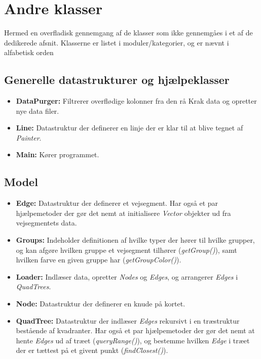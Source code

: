 \section{Andre klasser}

Hermed en overfladisk gennemgang af de klasser som ikke gennemgåes i et af de dedikerede afsnit. Klasserne er listet i moduler/kategorier, og er nævnt i alfabetisk orden

\subsection{Generelle datastrukturer og hjælpeklasser}

\begin{itemize}
	\item \textbf{DataPurger:} Filtrerer overflødige kolonner fra den rå Krak data og opretter nye data filer.
	\item \textbf{Line:} Datastruktur der definerer en linje der er klar til at blive tegnet af \emph{Painter}.
	\item \textbf{Main:} Kører programmet.
\end{itemize}

\subsection{Model}

\begin{itemize}
	\item \textbf{Edge:} Datastruktur der definerer et vejsegment. Har også et par hjælpemetoder der gør det nemt at initialisere \emph{Vector} objekter ud fra vejsegmentets data.
	\item \textbf{Groups:} Indeholder definitionen af hvilke typer der hører til hvilke grupper, og kan afgøre hvilken gruppe et vejsegment tilhører (\emph{getGroup()}), samt hvilken farve en given gruppe har (\emph{getGroupColor()}).
	\item \textbf{Loader:} Indlæser data, opretter \emph{Nodes} og \emph{Edges}, og arrangerer \emph{Edges} i \emph{QuadTrees}.
	\item \textbf{Node:} Datastruktur der definerer en knude på kortet.
	\item \textbf{QuadTree:} Datastruktur der indlæser \emph{Edges} rekursivt i en træstruktur bestående af kvadranter. Har også et par hjælpemetoder der gør det nemt at hente \emph{Edges} ud af træet (\emph{queryRange()}), og bestemme hvilken \emph{Edge} i træet der er tættest på et givent punkt (\emph{findClosest()}).
\end{itemize}

